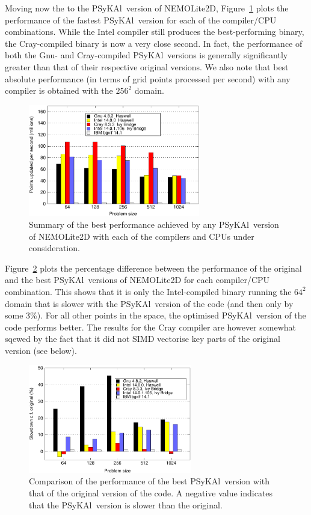 \documentclass[journal]{IEEEtran}
\newcommand{\psykal}{{PS}y{KA}l}
\begin{document}
Moving now the to the \psykal\ version of NEMOLite2D,
Figure~\ref{FIG_best_psykal_perf_summary} plots the performance of the
fastest \psykal\ version for each of the compiler/CPU combinations.
While the Intel compiler still produces the best-performing binary,
the Cray-compiled binary is now a very close second. In fact, the
performance of both the Gnu- and Cray-compiled \psykal\ versions is
generally significantly greater than that of their respective original
versions. We also note that best absolute performance (in terms of
grid points processed per second) with any compiler is obtained with
the $256^2$ domain.

\begin{figure}[!t]
\centering
\includegraphics[width=7.5cm]{best_psykal_summary}
\caption{Summary of the best performance achieved by any \psykal\ 
version of NEMOLite2D with each of the compilers and CPUs under 
consideration.}
\label{FIG_best_psykal_perf_summary}
\end{figure}

Figure~\ref{FIG_slowdown_summary} plots the percentage difference
between the performance of the original and the best \psykal\ versions
of NEMOLite2D for each compiler/CPU combination. This shows that it is
only the Intel-compiled binary running the $64^2$ domain that is
slower with the \psykal\ version of the code (and then only by some
3\%). For all other points in the space, the optimised \psykal\ version
of the code performs better. The results for the Cray compiler are
however somewhat sqewed by the fact that it did not SIMD vectorise key
parts of the original version (see below).

\begin{figure}[!t]
\centering
\includegraphics[width=2.8in]{slowdown_summary}
\caption{Comparison of the performance of the best \psykal\
version with that of the original version of the code. A negative value 
indicates that the \psykal\ version is slower than the original.}
\label{FIG_slowdown_summary}
\end{figure}
\end{document}
